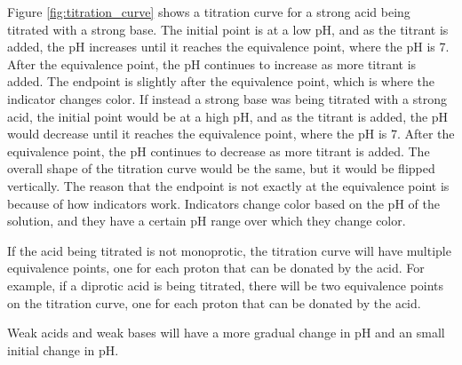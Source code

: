 Figure \ref{fig:titration_curve} shows a titration curve for a strong acid being titrated with a strong base. The initial point is at a low pH, and as the titrant is added, the pH increases until it reaches the equivalence point, where the pH is 7. After the equivalence point, the pH continues to increase as more titrant is added. The endpoint is slightly after the equivalence point, which is where the indicator changes color. If instead a strong base was being titrated with a strong acid, the initial point would be at a high pH, and as the titrant is added, the pH would decrease until it reaches the equivalence point, where the pH is 7. After the equivalence point, the pH continues to decrease as more titrant is added. The overall shape of the titration curve would be the same, but it would be flipped vertically. The reason that the endpoint is not exactly at the equivalence point is because of how indicators work. Indicators change color based on the pH of the solution, and they have a certain pH range over which they change color.  

If the acid being titrated is not monoprotic, the titration curve will have multiple equivalence points, one for each proton that can be donated by the acid. For example, if a diprotic acid is being titrated, there will be two equivalence points on the titration curve, one for each proton that can be donated by the acid. 

Weak acids and weak bases will have a more gradual change in pH and an small initial change in pH.

